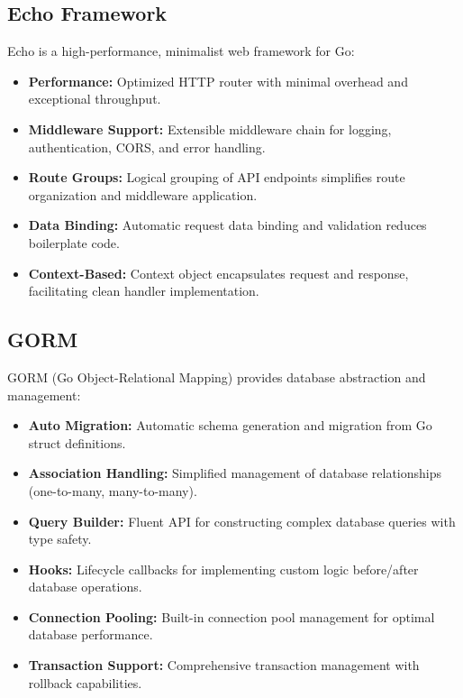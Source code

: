 \subsection{Echo Framework}

Echo is a high-performance, minimalist web framework for Go:

\begin{itemize}
    \item \textbf{Performance:} Optimized HTTP router with minimal overhead and exceptional throughput.
    \item \textbf{Middleware Support:} Extensible middleware chain for logging, authentication, CORS, and error handling.
    \item \textbf{Route Groups:} Logical grouping of API endpoints simplifies route organization and middleware application.
    \item \textbf{Data Binding:} Automatic request data binding and validation reduces boilerplate code.
    \item \textbf{Context-Based:} Context object encapsulates request and response, facilitating clean handler implementation.
\end{itemize}

\subsection{GORM}

GORM (Go Object-Relational Mapping) provides database abstraction and management:

\begin{itemize}
    \item \textbf{Auto Migration:} Automatic schema generation and migration from Go struct definitions.
    \item \textbf{Association Handling:} Simplified management of database relationships (one-to-many, many-to-many).
    \item \textbf{Query Builder:} Fluent API for constructing complex database queries with type safety.
    \item \textbf{Hooks:} Lifecycle callbacks for implementing custom logic before/after database operations.
    \item \textbf{Connection Pooling:} Built-in connection pool management for optimal database performance.
    \item \textbf{Transaction Support:} Comprehensive transaction management with rollback capabilities.
\end{itemize}

